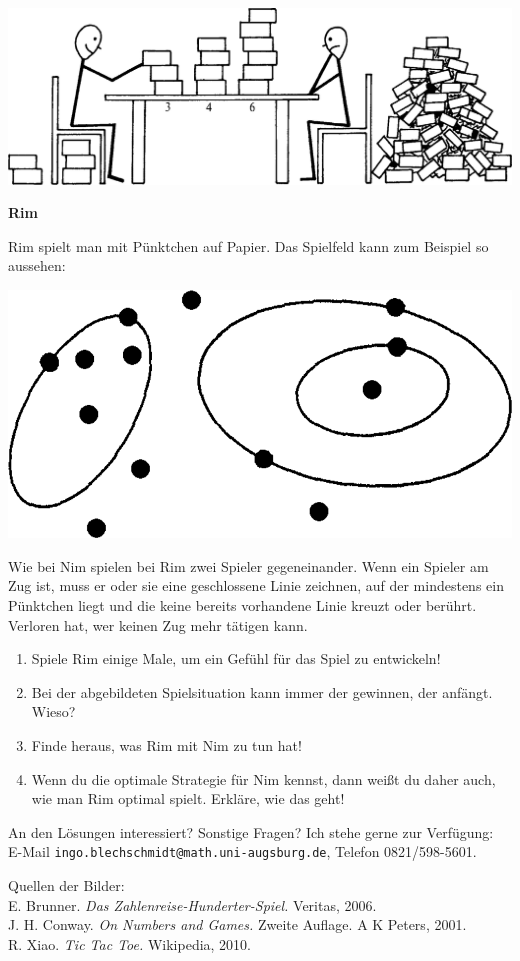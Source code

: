 \documentclass[a4paper,ngerman,14pt]{scrartcl}
\newcommand{\header}[1]{\begin{center}
  \Huge\textbf{\textsf{#1}}
\end{center}}
\begin{document}
\begin{center}
\includegraphics[scale=0.5]{nim}
\end{center}

\newpage

\header{Rim}

Rim spielt man mit Pünktchen auf Papier. Das Spielfeld kann zum Beispiel so
aussehen:
\begin{center}
\includegraphics[scale=0.3]{../rim}
\end{center}
Wie bei Nim spielen bei Rim zwei Spieler gegeneinander.
Wenn ein Spieler am Zug ist, muss er oder sie
eine geschlossene Linie zeichnen, auf der mindestens ein Pünktchen liegt und
die keine bereits vorhandene Linie kreuzt oder berührt. Verloren hat, wer
keinen Zug mehr tätigen kann.

\begin{enumerate}
\item Spiele Rim einige Male, um ein Gefühl für das Spiel zu entwickeln!
\item Bei der abgebildeten Spielsituation kann immer der gewinnen, der anfängt.
Wieso?
\item Finde heraus, was Rim mit Nim zu tun hat!
\item Wenn du die optimale Strategie für Nim kennst, dann weißt du daher auch,
wie man Rim optimal spielt. Erkläre, wie das geht!
\end{enumerate}

\vfill
\small
An den Lösungen interessiert? Sonstige Fragen? Ich stehe gerne zur Verfügung:
\\
E-Mail \texttt{ingo.blechschmidt@math.uni-augsburg.de},
Telefon 0821/598-5601.

Quellen der Bilder: \\
E. Brunner. \emph{Das Zahlenreise-Hunderter-Spiel.} Veritas, 2006. \\
J. H. Conway. \emph{On Numbers and Games.} Zweite Auflage. A K Peters, 2001. \\
R. Xiao. \emph{Tic Tac Toe.} Wikipedia, 2010.
\end{document}
